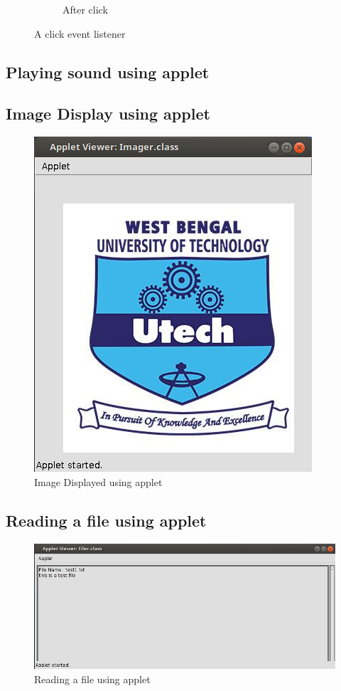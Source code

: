 \documentclass[a4paper,16pt]{article}
\begin{document}
\begin{figure}[h!]
\begin{subfigure}[h]{0.39\linewidth}
			\caption{After click}
		\end{subfigure}%
		\caption{A click event listener}
	\end{figure}
	\newpage
	\subsection{Playing sound using applet}
	
	\newpage
	\subsection{Image Display using applet}
	
	\begin{figure}[h]
		\centering
		\includegraphics[width=0.5\linewidth]{code/ImageDisplay/image.png}
		\caption{Image Displayed using applet}
	\end{figure}
	\newpage
	\subsection{Reading a file using applet}
	
	\begin{figure}[h]
		\centering 
		\includegraphics[scale=0.51]{code/Files/file.png}
		\caption{Reading a file using applet}
	\end{figure}
	
\end{document}
